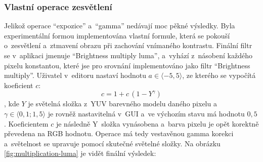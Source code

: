 \documentclass[11pt, a4paper, titlepage]{article}
\renewcommand{\uv}[1]{``#1''}
\begin{document}
\subsubsection{Vlastní operace zesvětlení}
Jelikož operace \uv{expozice} a~\uv{gamma} nedávají moc pěkné výsledky.
Byla experimentální formou implementována vlastní formule, která se pokouší o~zesvětlení a~ztmavení obrazu při zachování vnímaného kontrastu.
Finální filtr se v~aplikaci jmenuje \uv{Brightness multiply luma}, a~vyhází z~násobení každého pixelu konstantou, které jse pro srovnání implementováno jako filtr \uv{Brightness multiply}.
Uživatel v~editoru nastaví hodnotu $a \in \langle-5,5\rangle$, ze kterého se vypočítá koeficient $c$:
$$c=1+c\,(1 - Y^\gamma)$$
, kde $Y$ je světelná složka z~YUV barevného modelu\cite{wiki:YCbCr} daného pixelu a~$\gamma \in \langle0,1;1,5\rangle$ je rovněž nastavitelná v~GUI a~ve výchozím stavu má hodnotu $0,5$.
Koeficientem $c$ je následně Y~složka vynásobena a~barva pixelu je opět korektně převedena na RGB hodnotu.
Operace má tedy vestavěnou gamma korekci a~světelnost se upravuje pomocí skutečné světelné složky.
Na obrázku \ref{fig:multiplication-luma} je vidět finální výsledek:
\end{document}

